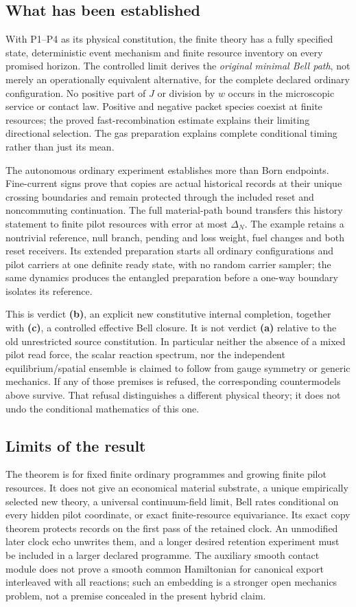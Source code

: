 \documentclass[11pt,oneside,openany]{book}
\theoremstyle{definition}
\theoremstyle{remark}\newtheorem{remark}[theorem]{Remark}
\begin{document}
\subsection{What has been established}
With P1--P4 as its physical constitution, the finite theory has a fully specified state, deterministic event mechanism and finite resource inventory on every promised horizon. The controlled limit derives the \emph{original minimal Bell path}, not merely an operationally equivalent alternative, for the complete declared ordinary configuration. No positive part of $J$ or division by $w$ occurs in the microscopic service or contact law. Positive and negative packet species coexist at finite resources; the proved fast-recombination estimate explains their limiting directional selection. The gas preparation explains complete conditional timing rather than just its mean.

The autonomous ordinary experiment establishes more than Born endpoints. Fine-current signs prove that copies are actual historical records at their unique crossing boundaries and remain protected through the included reset and noncommuting continuation. The full material-path bound transfers this history statement to finite pilot resources with error at most $\Delta_N$. The example retains a nontrivial reference, null branch, pending and loss weight, fuel changes and both reset receivers. Its extended preparation starts all ordinary configurations and pilot carriers at one definite ready state, with no random carrier sampler; the same dynamics produces the entangled preparation before a one-way boundary isolates its reference.

This is verdict \textbf{(b)}, an explicit new constitutive internal completion, together with \textbf{(c)}, a controlled effective Bell closure. It is not verdict \textbf{(a)} relative to the old unrestricted source constitution. In particular neither the absence of a mixed pilot read force, the scalar reaction spectrum, nor the independent equilibrium/spatial ensemble is claimed to follow from gauge symmetry or generic mechanics. If any of those premises is refused, the corresponding countermodels above survive. That refusal distinguishes a different physical theory; it does not undo the conditional mathematics of this one.

\subsection{Limits of the result}
The theorem is for fixed finite ordinary programmes and growing finite pilot resources. It does not give an economical material substrate, a unique empirically selected new theory, a universal continuum-field limit, Bell rates conditional on every hidden pilot coordinate, or exact finite-resource equivariance. Its exact copy theorem protects records on the first pass of the retained clock. An unmodified later clock echo unwrites them, and a longer desired retention experiment must be included in a larger declared programme. The auxiliary smooth contact module does not prove a smooth common Hamiltonian for canonical export interleaved with all reactions; such an embedding is a stronger open mechanics problem, not a premise concealed in the present hybrid claim.
\end{document}
